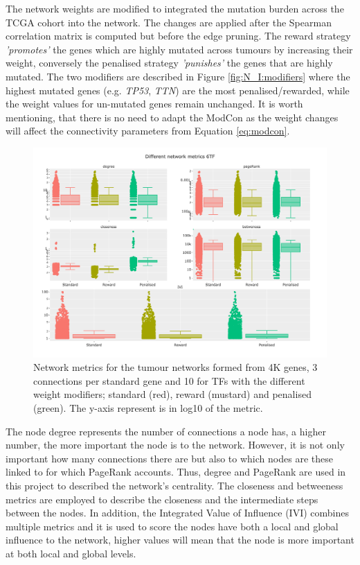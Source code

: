 The network weights are modified to integrated the mutation burden across the TCGA cohort into the network. The changes are applied after the Spearman correlation matrix is computed but before the edge pruning. The reward strategy \textit{'promotes'} the genes which are highly mutated across tumours by increasing their weight, conversely the penalised strategy \textit{'punishes'} the genes that are highly mutated. The two modifiers are described in Figure \ref{fig:N_I:modifiers} where the highest mutated genes (e.g. \textit{TP53}, \textit{TTN}) are the most penalised/rewarded, while the weight values for un-mutated genes remain unchanged. It is worth mentioning, that there is no need to adapt the ModCon as the weight changes will affect the connectivity parameters from Equation \ref{eq:modcon}.

\begin{figure}[!t]  
\centering
\includegraphics[width=1.0\textwidth,keepaspectratio]{Sections/Network_I/Resources/Tum_network/NetworkMetricsComp_6TF.png}
    \caption{Network metrics for the tumour networks formed from 4K genes, 3 connections per standard gene and 10 for TFs with the different weight modifiers; standard (red), reward (mustard) and penalised (green). The y-axis represent is in log10 of the metric.}
    \label{fig:N_I:net_metrics_tum}
\end{figure}

The node degree represents the number of connections a node has, a higher number, the more important the node is to the network. However, it is not only important how many connections there are but also to which nodes are these linked to for which PageRank\cite{Brin1998-mc} accounts. Thus, degree and PageRank are used in this project to described the network's centrality. The closeness and betweeness metrics are employed to describe the closeness and the intermediate steps between the nodes. In addition, the Integrated Value of Influence (IVI) \cite{Salavaty2020-wo} combines multiple metrics and it is used to score the nodes have both a local and global influence to the network, higher values will mean that the node is more important at both local and global levels.

